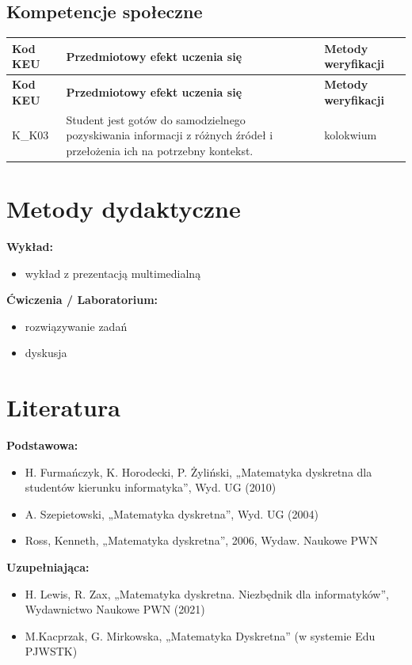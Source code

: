 \documentclass[12pt, a4paper]{article}
\newcommand{\thdrule}{\noalign{\global\setlength{\extrarowheight}{0pt}}}
\newcommand{\thdend}{\noalign{\global\setlength{\extrarowheight}{3pt}}}
\begin{document}
\subsection*{Kompetencje społeczne}
{\scriptsize
\begin{longtable}{m{1.6cm}m{9.0cm}m{4.2cm}}
\thdrule\toprule
\rowcolor{pjatkRed} {\color{white}\footnotesize\textbf{\vphantom{Ag}Kod KEU}} & {\color{white}\footnotesize\textbf{\vphantom{Ag}Przedmiotowy efekt uczenia się}} & {\color{white}\footnotesize\textbf{\vphantom{Ag}Metody weryfikacji}} \\
\midrule\thdend
\endfirsthead
\thdrule\toprule
\rowcolor{pjatkRed} {\color{white}\footnotesize\textbf{\vphantom{Ag}Kod KEU}} & {\color{white}\footnotesize\textbf{\vphantom{Ag}Przedmiotowy efekt uczenia się}} & {\color{white}\footnotesize\textbf{\vphantom{Ag}Metody weryfikacji}} \\
\midrule\thdend
\endhead
  \rowcolor{tableRowLight} K\_K03 & Student jest gotów do samodzielnego pozyskiwania informacji z różnych źródeł i przełożenia ich na potrzebny kontekst. & kolokwium \\
\bottomrule
\end{longtable}}

\section{Metody dydaktyczne}

\textbf{Wykład:}
\begin{itemize}
  \item wykład z prezentacją multimedialną
\end{itemize}
\vspace{4pt}
\textbf{Ćwiczenia / Laboratorium:}
\begin{itemize}
  \item rozwiązywanie zadań
  \item dyskusja
\end{itemize}
\vspace{4pt}


\section{Literatura}

\textbf{Podstawowa:}
\begin{itemize}
  \item H. Furmańczyk, K. Horodecki, P. Żyliński, „Matematyka dyskretna dla studentów kierunku informatyka”, Wyd. UG (2010)
  \item A. Szepietowski, „Matematyka dyskretna”, Wyd. UG (2004)
  \item Ross, Kenneth, „Matematyka dyskretna”, 2006, Wydaw. Naukowe PWN
\end{itemize}

\textbf{Uzupełniająca:}
\begin{itemize}
  \item H. Lewis, R. Zax, „Matematyka dyskretna. Niezbędnik dla informatyków”, Wydawnictwo Naukowe PWN (2021)
  \item M.Kacprzak, G. Mirkowska, „Matematyka Dyskretna” (w systemie Edu PJWSTK)
\end{itemize}
\end{document}
